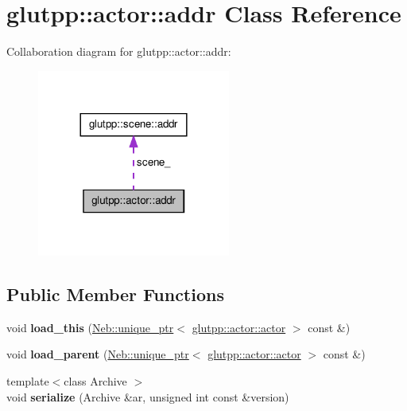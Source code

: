 \hypertarget{classglutpp_1_1actor_1_1addr}{\section{glutpp\-:\-:actor\-:\-:addr \-Class \-Reference}
\label{classglutpp_1_1actor_1_1addr}
}


\-Collaboration diagram for glutpp\-:\-:actor\-:\-:addr\-:\nopagebreak
\begin{figure}[H]
\begin{center}
\leavevmode
\includegraphics[width=180pt]{classglutpp_1_1actor_1_1addr__coll__graph}
\end{center}
\end{figure}
\subsection*{\-Public \-Member \-Functions}
\begin{DoxyCompactItemize}
\item 
\hypertarget{classglutpp_1_1actor_1_1addr_a432486e8010639579940591cbbc354b2}{void {\bfseries load\-\_\-this} (\hyperlink{classNeb_1_1unique__ptr}{\-Neb\-::unique\-\_\-ptr}$<$ \hyperlink{classglutpp_1_1actor_1_1actor}{glutpp\-::actor\-::actor} $>$ const \&)}\label{classglutpp_1_1actor_1_1addr_a432486e8010639579940591cbbc354b2}

\item 
\hypertarget{classglutpp_1_1actor_1_1addr_aa8d769177daf4e80e512e254d3ccb5d0}{void {\bfseries load\-\_\-parent} (\hyperlink{classNeb_1_1unique__ptr}{\-Neb\-::unique\-\_\-ptr}$<$ \hyperlink{classglutpp_1_1actor_1_1actor}{glutpp\-::actor\-::actor} $>$ const \&)}\label{classglutpp_1_1actor_1_1addr_aa8d769177daf4e80e512e254d3ccb5d0}

\item 
\hypertarget{classglutpp_1_1actor_1_1addr_a4ae74163dadaeb15c4fc25afc4066aea}{{\footnotesize template$<$class Archive $>$ }\\void {\bfseries serialize} (\-Archive \&ar, unsigned int const \&version)}\label{classglutpp_1_1actor_1_1addr_a4ae74163dadaeb15c4fc25afc4066aea}

\end{DoxyCompactItemize}
